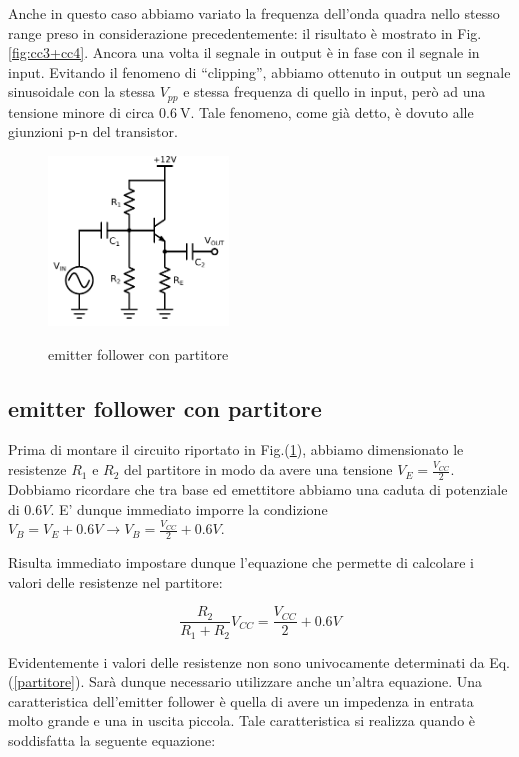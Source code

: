 Anche in questo caso abbiamo variato la frequenza dell'onda quadra nello stesso range preso in considerazione precedentemente: il risultato è mostrato in Fig. \ref{fig:cc3+cc4}.
Ancora una volta il segnale in output è in fase con il segnale in input.
Evitando il fenomeno di ``clipping'', abbiamo ottenuto in output un segnale sinusoidale con la stessa $V_{pp}$ e stessa frequenza di quello in input, però ad una tensione minore di circa $\SI{0.6}{\volt}$. Tale fenomeno, come già detto, è dovuto alle giunzioni p-n del transistor.

\begin{figure}
	\caption{emitter follower con partitore}
	\includegraphics[height=45mm]{cc5.pdf}
	\label{fig:cc5}
\end{figure}

\subsection{emitter follower con partitore}

%
%

Prima di montare il circuito riportato in Fig.(\ref{fig:cc5}), abbiamo dimensionato le resistenze $R_1$ e $R_2$ del partitore in modo da avere una tensione $V_E=\frac{V_{CC}}{2}$. Dobbiamo ricordare che tra base ed emettitore abbiamo una caduta di potenziale di $0.6V$. E' dunque immediato imporre la condizione $V_B=V_E + 0.6V \rightarrow V_B=\frac{V_{CC}}{2} + 0.6V $.

Risulta immediato impostare dunque l'equazione che permette di calcolare i valori delle resistenze nel partitore:

\begin{equation}
\frac{R_2}{R_1+R_2} V_{CC}=\frac{V_{CC}}{2} + 0.6V
\label{partitore}
\end{equation}

Evidentemente i valori delle resistenze non sono univocamente determinati da Eq.(\ref{partitore}). Sarà dunque necessario utilizzare anche un'altra equazione. Una caratteristica dell'emitter follower è quella di avere un impedenza in entrata molto grande e una in uscita piccola. Tale caratteristica si realizza quando è soddisfatta la seguente equazione:

